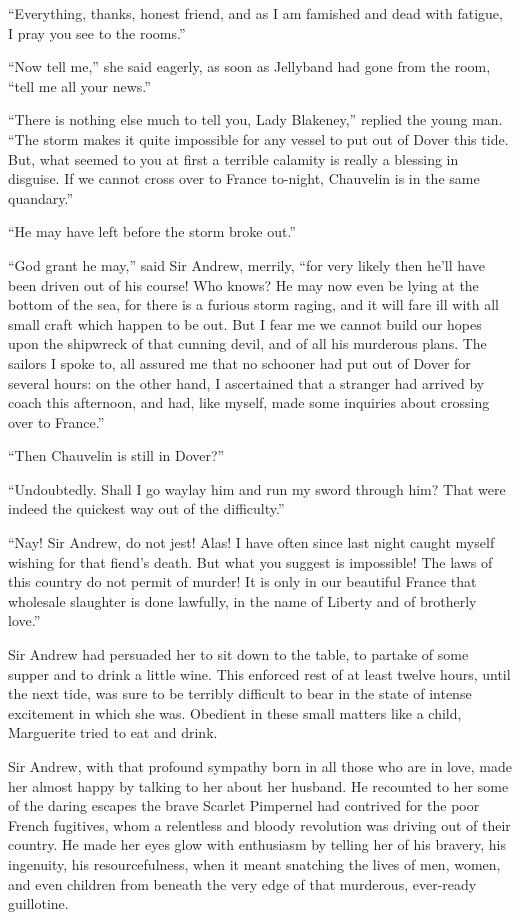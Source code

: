 \documentclass[paper=5.5in:8.5in,BCOR=7mm,twoside,DIV=calc,12pt,usegeometry,chapterprefix,endperiod,headings=big]{scrbook}
\begin{document}
\enquote{Everything, thanks, honest friend, and as I am famished and dead with fatigue, I pray you see to the rooms.}

\enquote{Now tell me,} she said eagerly, as soon as Jellyband had gone from the room, \enquote{tell me all your news.}

\enquote{There is nothing else much to tell you, Lady Blakeney,} replied the young man. \enquote{The storm makes it quite impossible for any vessel to put out of Dover this tide. But, what seemed to you at first a terrible calamity is really a blessing in disguise. If we cannot cross over to France to-night, Chauvelin is in the same quandary.}

\enquote{He may have left before the storm broke out.}

\enquote{God grant he may,} said Sir Andrew, merrily, \enquote{for very likely then he'll have been driven out of his course! Who knows? He may now even be lying at the bottom of the sea, for there is a furious storm raging, and it will fare ill with all small craft which happen to be out. But I fear me we cannot build our hopes upon the shipwreck of that cunning devil, and of all his murderous plans. The sailors I spoke to, all assured me that no schooner had put out of Dover for several hours: on the other hand, I ascertained that a stranger had arrived by coach this afternoon, and had, like myself, made some inquiries about crossing over to France.}

\enquote{Then Chauvelin is still in Dover?}

\enquote{Undoubtedly. Shall I go waylay him and run my sword through him? That were indeed the quickest way out of the difficulty.}

\enquote{Nay! Sir Andrew, do not jest! Alas! I have often since last night caught myself wishing for that fiend's death. But what you suggest is impossible! The laws of this country do not permit of murder! It is only in our beautiful France that wholesale slaughter is done lawfully, in the name of Liberty and of brotherly love.}

Sir Andrew had persuaded her to sit down to the table, to partake of some supper and to drink a little wine. This enforced rest of at least twelve hours, until the next tide, was sure to be terribly difficult to bear in the state of intense excitement in which she was. Obedient in these small matters like a child, Marguerite tried to eat and drink.

Sir Andrew, with that profound sympathy born in all those who are in love, made her almost happy by talking to her about her husband. He recounted to her some of the daring escapes the brave Scarlet Pimpernel had contrived for the poor French fugitives, whom a relentless and bloody revolution was driving out of their country. He made her eyes glow with enthusiasm by telling her of his bravery, his ingenuity, his resourcefulness, when it meant snatching the lives of men, women, and even children from beneath the very edge of that murderous, ever-ready guillotine.
\end{document}
